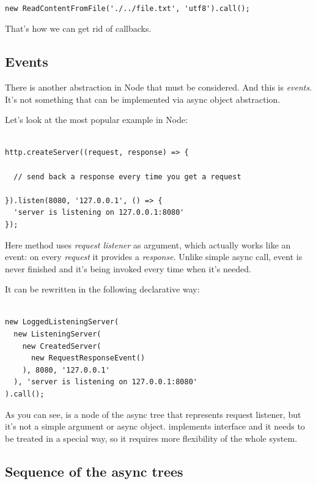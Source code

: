 \documentclass{article}
\newcommand{\cit}[1]{{\fontfamily{qcr}\selectfont{\textcolor{superdarkgray}{#1}}}}
\begin{document}
\begin{lstlisting}

new ReadContentFromFile('./../file.txt', 'utf8').call();

\end{lstlisting}

That's how we can get rid of callbacks.

\subsection{Events}

There is another abstraction in Node that must be considered. And this is \textit{events}. It's not something that can be implemented via async object abstraction.

Let's look at the most popular example in Node:

\begin{lstlisting}

http.createServer((request, response) => {

  // send back a response every time you get a request

}).listen(8080, '127.0.0.1', () => {
  'server is listening on 127.0.0.1:8080'
});

\end{lstlisting}

Here method \cit{createServer} uses \textit{request listener} as argument, which actually works like an event: on every \textit{request} it provides a  \textit{response}. Unlike simple async call, event is never finished and it's being invoked every time when it's needed.

It can be rewritten in the following declarative way:

\begin{lstlisting}

new LoggedListeningServer(
  new ListeningServer(
    new CreatedServer(
      new RequestResponseEvent()
    ), 8080, '127.0.0.1'
  ), 'server is listening on 127.0.0.1:8080'
).call();

\end{lstlisting}

As you can see, \cit{RequestResponseEvent} is a node of the async tree that represents request listener, but it's not a simple argument or async object. \cit{RequestResponseEvent} implements \cit{Event} interface and it needs to be treated in a special way, so it requires more flexibility of the whole system.

\subsection{Sequence of the async trees}
\end{document}
